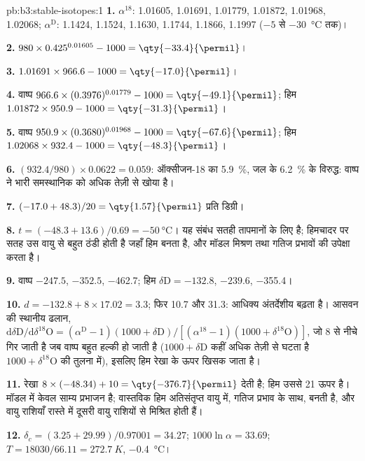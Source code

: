 \begin{solution}{pb:b3:stable-isotopes:1}
\textbf{1.} $\alpha^{18}$: 1.01605, 1.01691, 1.01779, 1.01872, 1.01968,
1.02068; $\alpha^{\mathrm D}$: 1.1424, 1.1524, 1.1630, 1.1744, 1.1866, 1.1997
($-5$ से \qty{-30}{\celsius} तक)।

\textbf{2.} $980\times0.425^{0.01605} - 1000 = \qty{-33.4}{\permil}$।

\textbf{3.} $1.01691\times966.6 - 1000 = \qty{-17.0}{\permil}$।

\textbf{4.} वाष्प $966.6\times(0.3976)^{0.01779} - 1000 = \qty{-49.1}{\permil}$;
हिम $1.01872\times950.9 - 1000 = \qty{-31.3}{\permil}$।

\textbf{5.} वाष्प $950.9\times(0.3680)^{0.01968} - 1000 = \qty{-67.6}{\permil}$;
हिम $1.02068\times932.4 - 1000 = \qty{-48.3}{\permil}$।

\textbf{6.} $(932.4/980)\times0.0622 = 0.059$: ऑक्सीजन-18 का \qty{5.9}{\percent},
जल के \qty{6.2}{\percent} के विरुद्ध: वाष्प ने
भारी समस्थानिक को अधिक तेज़ी से खोया है।

\textbf{7.} $(-17.0 + 48.3)/20 = \qty{1.57}{\permil}$ प्रति डिग्री।

\textbf{8.} $t = (-48.3 + 13.6)/0.69 = \qty{-50}{\celsius}$। यह संबंध
सतही तापमानों के लिए है; हिमचादर पर सतह उस वायु से बहुत ठंडी होती है
जहाँ हिम बनता है, और मॉडल मिश्रण तथा गतिज प्रभावों की उपेक्षा करता है।

\textbf{9.} वाष्प $-247.5$, $-352.5$, \qty{-462.7}{\permil}; हिम $\delta\mathrm D
= -132.8$, $-239.6$, \qty{-355.4}{\permil}।

\textbf{10.} $d = -132.8 + 8\times17.02 = 3.3$; फिर 10.7 और
\qty{31.3}{\permil}: आधिक्य अंतर्देशीय बढ़ता है। आसवन की स्थानीय ढलान,
$\mathrm d\delta\mathrm D/\mathrm d\delta^{18}\mathrm O = (\alpha^{\mathrm D} -
1)(1000 + \delta\mathrm D)/[(\alpha^{18} - 1)(1000 + \delta^{18}\mathrm O)]$, जो
8 से नीचे गिर जाती है जब वाष्प बहुत हल्की हो जाती है ($1000 + \delta\mathrm D$ कहीं अधिक तेज़ी से
घटता है $1000 + \delta^{18}\mathrm O$ की तुलना में), इसलिए हिम रेखा के ऊपर खिसक जाता है।

\textbf{11.} रेखा $8\times(-48.34) + 10 = \qty{-376.7}{\permil}$ देती है;
हिम उससे \qty{21}{\permil} ऊपर है। मॉडल में केवल साम्य प्रभाजन है;
वास्तविक हिम अतिसंतृप्त वायु में, गतिज प्रभाव के साथ, बनती है,
और वायु राशियाँ रास्ते में दूसरी वायु राशियों से मिश्रित होती हैं।

\textbf{12.} $\delta_c = (3.25 + 29.99)/0.97001 = 34.27$; $1000\ln\alpha =
33.69$; $T = 18030/66.11 = \qty{272.7}{K}$, \qty{-0.4}{\celsius}।


\end{solution}
